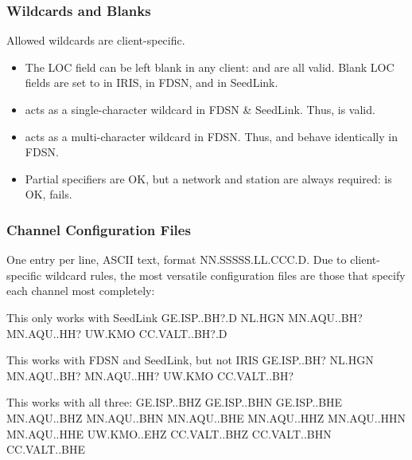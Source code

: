 \documentclass[letterpaper,11pt,english]{sphinxmanual}
\begin{document}
\subsubsection{Wildcards and Blanks}
\label{\detokenize{src/Appendices/web_syntax:wildcards-and-blanks}}
Allowed wildcards are client-specific.
\begin{itemize}
\item {} 
The LOC field can be left blank in any client:  and  are all valid. Blank LOC fields are set to \sphinxcode{\sphinxupquote{-{-}}} in IRIS, \sphinxcode{\sphinxupquote{*}} in FDSN, and  in SeedLink.

\item {} 
 acts as a single-character wildcard in FDSN \& SeedLink. Thus,  is valid.

\item {} 
\sphinxcode{\sphinxupquote{*}} acts as a multi-character wildcard in FDSN. Thus,  and  behave identically in FDSN.

\item {} 
Partial specifiers are OK, but a network and station are always required:  is OK,  fails.

\end{itemize}


\subsubsection{Channel Configuration Files}
\label{\detokenize{src/Appendices/web_syntax:channel-configuration-files}}\label{\detokenize{src/Appendices/web_syntax:ccfg}}
One entry per line, ASCII text, format NN.SSSSS.LL.CCC.D. Due to client-specific wildcard rules, the most versatile configuration files are those that specify each channel most completely:

\begin{sphinxVerbatim}[commandchars=\\\{\}]
\PYGZsh{} This only works with SeedLink
GE.ISP..BH?.D
NL.HGN
MN.AQU..BH?
MN.AQU..HH?
UW.KMO
CC.VALT..BH?.D

\PYGZsh{} This works with FDSN and SeedLink, but not IRIS
GE.ISP..BH?
NL.HGN
MN.AQU..BH?
MN.AQU..HH?
UW.KMO
CC.VALT..BH?

\PYGZsh{} This works with all three:
GE.ISP..BHZ
GE.ISP..BHN
GE.ISP..BHE
MN.AQU..BHZ
MN.AQU..BHN
MN.AQU..BHE
MN.AQU..HHZ
MN.AQU..HHN
MN.AQU..HHE
UW.KMO..EHZ
CC.VALT..BHZ
CC.VALT..BHN
CC.VALT..BHE
\end{sphinxVerbatim}
\end{document}

